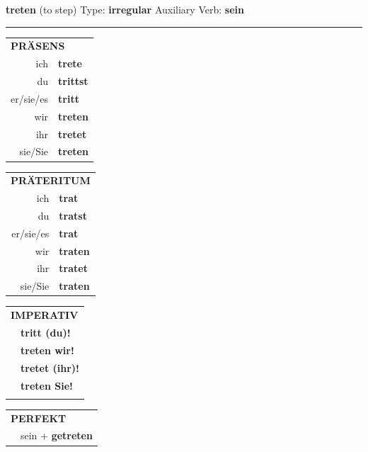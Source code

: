 \documentclass[10pt,a4paper]{revtex4-2}
\begin{document}
\begin{verbbox}
    {\Large \bf treten} (to step) \hfill Type: \textbf{irregular} \hfill Auxiliary Verb: \textbf{sein} 
    
     \vspace{5pt}

    \hrule
    
    \vspace{5pt}

  \begin{tabular}{rl}
     \multicolumn{2}{l}{\textbf{PRÄSENS} }\\
    ich & \textbf{trete}\\
    du & \textbf{trittst}\\
    er/sie/es & \textbf{tritt}\\
    wir & \textbf{treten}\\
    ihr & \textbf{tretet}\\
    sie/Sie & \textbf{treten}\\
  \end{tabular}
  \hfill
     \begin{tabular}{rl}
    \multicolumn{2}{l}{\textbf{PRÄTERITUM} }\\
    ich & \textbf{trat}\\
    du & \textbf{tratst}\\
    er/sie/es & \textbf{trat}\\
    wir & \textbf{traten}\\
    ihr & \textbf{tratet}\\
    sie/Sie & \textbf{traten}\\
  \end{tabular}
  \hfill
  \begin{tabular}{rl}
     \multicolumn{2}{l}{\textbf{IMPERATIV} }\\
   & \textbf{tritt (du)!}\\
   & \textbf{treten wir!}\\
   & \textbf{tretet (ihr)!}\\
   & \textbf{treten Sie!}\\
   & \vspace{10pt}
  \end{tabular}

    \vspace{10pt}

 \begin{tabular}{rl}
     \multicolumn{2}{l}{\textbf{PERFEKT}}\\
   & sein + \textbf{getreten}\\
  \end{tabular}
\hfill
   \begin{tabular}{rl}
   

\end{tabular}
\end{verbbox}
\end{document}
